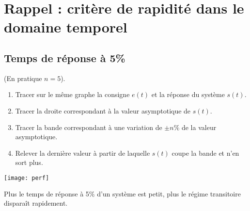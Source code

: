 %
%
%
%

\section{Rappel : critère de rapidité dans le domaine temporel}

\subsection{Temps de réponse à 5\%}

\begin{methode}
 (En pratique $n=5$).\\

\begin{enumerate}
\item Tracer sur le même graphe la consigne $e(t)$ et la réponse du système
$s(t)$.
\item Tracer la droite correspondant à la valeur asymptotique de $s(t)$.
\item Tracer la bande correspondant à une variation de $\pm n\%$ de la valeur
asymptotique.
\item Relever la dernière valeur à partir de laquelle $s(t)$ coupe la bande et
n'en sort plus.
\end{enumerate}
\end{methode}

\begin{center}
%
\texttt{[image: perf]}
\end{center}

\begin{resultat}
Plus le temps de réponse à 5\% d'un système est petit, plus le régime transitoire disparaît rapidement. 
\end{resultat}


